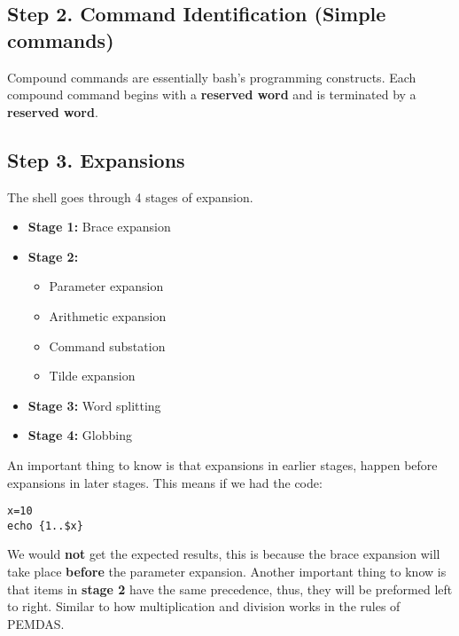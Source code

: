 \documentclass{report}
\begin{document}
   \bigbreak \noindent 
  \subsection{Step 2. Command Identification (Simple commands)}
  \bigbreak \noindent 
  \begin{concept}
		 Compound commands are essentially bash's programming constructs. Each compound command begins with a \textbf{reserved word} and is terminated by a \textbf{reserved word}.
	\end{concept}

  \bigbreak \noindent 
  \subsection{Step 3. Expansions}
  \bigbreak \noindent 
  The shell goes through 4 stages of expansion.
  \begin{itemize}
      \item \textbf{Stage 1:} Brace expansion
        \item \textbf{Stage 2:}
            \begin{itemize}
                \item Parameter expansion
                \item Arithmetic expansion
                \item Command substation
                \item Tilde expansion
            \end{itemize}
        \item \textbf{Stage 3:} Word splitting
        \item \textbf{Stage 4:} Globbing
  \end{itemize}
  \bigbreak \noindent 
  An important thing to know is that expansions in earlier stages, happen before expansions in later stages. This means if we had the code:
  
  \begin{verbatim}
x=10
echo {1..$x}
  \end{verbatim}
  \bigbreak \noindent
  
  \bigbreak \noindent 
  We would \textbf{not} get the expected results, this is because the brace expansion will take place \textbf{before} the parameter expansion.
  \bigbreak \noindent 
  Another important thing to know is that items in \textbf{stage 2} have the same precedence, thus, they will be preformed left to right. Similar to how multiplication and division works in the rules of PEMDAS.
\end{document}
